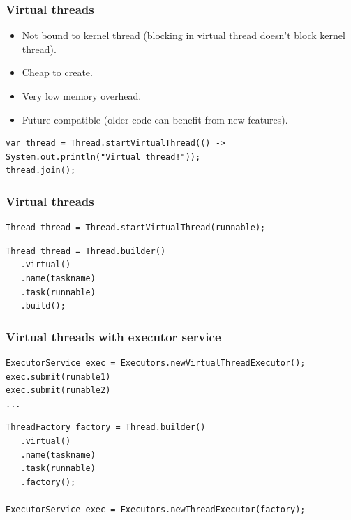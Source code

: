 \documentclass[10pt,utf8]{beamer}
\begin{document}
\begin{frame}[fragile]
	\frametitle{Virtual threads}
        \begin{itemize}
            \item Not bound to kernel thread (blocking in virtual thread doesn't block kernel thread).
            \item Cheap to create.
            \item Very low memory overhead.
            \item Future compatible (older code can benefit from new features).
        \end{itemize}

        \vspace{1cm}
        
	\begin{lstlisting}[style=java]
var thread = Thread.startVirtualThread(() -> System.out.println("Virtual thread!"));
thread.join();
	\end{lstlisting}
\end{frame}

\begin{frame}[fragile]
    \frametitle{Virtual threads}
    
    \begin{lstlisting}[style=java]
Thread thread = Thread.startVirtualThread(runnable);
    \end{lstlisting}
    
    \begin{lstlisting}[style=java]
Thread thread = Thread.builder()
   .virtual()
   .name(taskname)
   .task(runnable)
   .build();
    \end{lstlisting}
\end{frame}

\begin{frame}[fragile]
    \frametitle{Virtual threads with executor service}

    \begin{lstlisting}[style=java]
ExecutorService exec = Executors.newVirtualThreadExecutor();
exec.submit(runable1)
exec.submit(runable2)
...
    \end{lstlisting}
    
    \begin{lstlisting}[style=java]
ThreadFactory factory = Thread.builder()
   .virtual()
   .name(taskname)
   .task(runnable)
   .factory();

ExecutorService exec = Executors.newThreadExecutor(factory);
    \end{lstlisting}
\end{frame}
\end{document}
